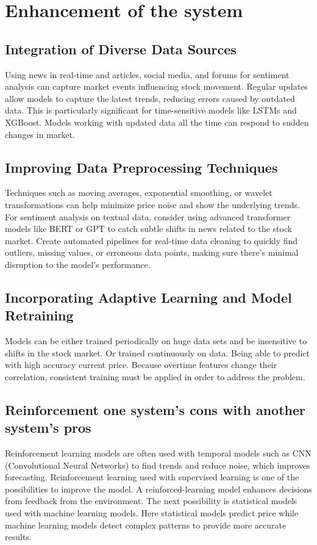 \documentclass[10pt,twoside,english,a4paper]{article}
\begin{document}
\section{Enhancement of the system}
\subsection{Integration of Diverse Data Sources}
Using news in real-time and articles, social media, and forums for sentiment analysis can capture market events influencing stock movement. Regular updates allow models to capture the latest trends, reducing errors caused by outdated data. This is particularly significant for time-sensitive models like LSTMs and XGBoost. Models working with updated data all the time can respond to sudden changes in market.\cite{diverse_datsrc}
\subsection{Improving Data Preprocessing Techniques}
Techniques such as moving averages, exponential smoothing, or wavelet transformations can help minimize price noise and show the underlying trends.
For sentiment analysis on textual data, consider using advanced transformer models like BERT or GPT to catch subtle shifts in news related to the stock market.
Create automated pipelines for real-time data cleaning to quickly find outliers, missing values, or erroneous data points, making sure there's minimal disruption to the model's performance.
\subsection{Incorporating Adaptive Learning and Model Retraining}
Models can be either trained periodically on huge data sets and be insensitive to shifts in the stock market. Or trained continuously on data. Being able to predict with high accuracy current price. Because overtime features change their correlation, consistent training must be applied in order to address the problem.\cite{adaptive_learning}
\subsection{Reinforcement one system's cons with another system's pros}
Reinforcement learning models are often used with temporal models such as CNN (Convolutional Neural Networks) to find trends and reduce noise, which improves forecasting. Reinforcement learning used with supervised learning is one of the possibilities to improve the model. A reinforced-learning model enhances decisions from feedback from the environment. The next possibility is statistical models used with machine learning models. Here statistical models predict price while machine learning models detect complex patterns to provide more accurate results.\cite{reinfocment}
\end{document}
